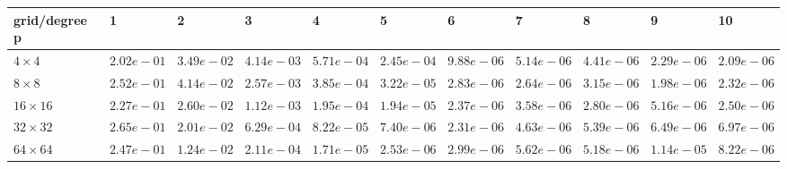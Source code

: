 \begin{tabular}{lllllllllll}
\hline
 grid/degree p   & 1          & 2          & 3          & 4          & 5          & 6          & 7          & 8          & 9          & 10         \\
\hline
 $4 \times 4$    & $2.02e-01$ & $3.49e-02$ & $4.14e-03$ & $5.71e-04$ & $2.45e-04$ & $9.88e-06$ & $5.14e-06$ & $4.41e-06$ & $2.29e-06$ & $2.09e-06$ \\
 $8 \times 8$    & $2.52e-01$ & $4.14e-02$ & $2.57e-03$ & $3.85e-04$ & $3.22e-05$ & $2.83e-06$ & $2.64e-06$ & $3.15e-06$ & $1.98e-06$ & $2.32e-06$ \\
 $16 \times 16$  & $2.27e-01$ & $2.60e-02$ & $1.12e-03$ & $1.95e-04$ & $1.94e-05$ & $2.37e-06$ & $3.58e-06$ & $2.80e-06$ & $5.16e-06$ & $2.50e-06$ \\
 $32 \times 32$  & $2.65e-01$ & $2.01e-02$ & $6.29e-04$ & $8.22e-05$ & $7.40e-06$ & $2.31e-06$ & $4.63e-06$ & $5.39e-06$ & $6.49e-06$ & $6.97e-06$ \\
 $64 \times 64$  & $2.47e-01$ & $1.24e-02$ & $2.11e-04$ & $1.71e-05$ & $2.53e-06$ & $2.99e-06$ & $5.62e-06$ & $5.18e-06$ & $1.14e-05$ & $8.22e-06$ \\
\hline
\end{tabular}